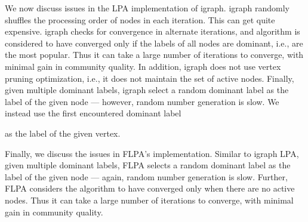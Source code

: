 We now discuss issues in the LPA implementation of igraph. igraph randomly shuffles the processing order of nodes in each iteration. This can get quite expensive. igraph checks for convergence in alternate iterations, and algorithm is considered to have converged only if the labels of all nodes are dominant, i.e., are the most popular. Thus it can take a large number of iterations to converge, with minimal gain in community quality. In addition, igraph does not use vertex pruning optimization, i.e., it does not maintain the set of active nodes. Finally, given multiple dominant labels, igraph select a random dominant label as the label of the given node --- however, random number generation is slow. We instead use the first encountered dominant label as the label of the given vertex.

Finally, we discuss the issues in FLPA's implementation. Similar to igraph LPA, given multiple dominant labels, FLPA selects a random dominant label as the label of the given node --- again, random number generation is slow. Further, FLPA considers the algorithm to have converged only when there are no active nodes. Thus it can take a large number of iterations to converge, with minimal gain in community quality.




